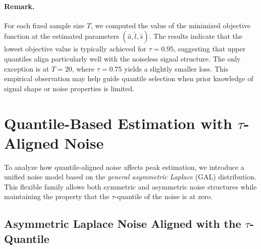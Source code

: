 \documentclass[12pt,a4paper]{article}
\begin{document}
\paragraph{Remark.} For each fixed sample size $T$, we computed the value of the minimized objective function at the estimated parameters $(\hat{a}, \hat{l}, \hat{s})$. The results indicate that the lowest objective value is typically achieved for $\tau = 0.95$, suggesting that upper quantiles align particularly well with the noiseless signal structure. The only exception is at $T = 20$, where $\tau = 0.75$ yields a slightly smaller loss. This empirical observation may help guide quantile selection when prior knowledge of signal shape or noise properties is limited.

\section{\texorpdfstring{Quantile-Based Estimation with $\tau$-Aligned Noise}{Quantile-Based Estimation with tau-Aligned Noise}}
\label{sec:symmetric_laplace_estimation}

To analyze how quantile-aligned noise affects peak estimation, we introduce a unified noise model based on the \textit{general asymmetric Laplace} (GAL) distribution. This flexible family allows both symmetric and asymmetric noise structures while maintaining the property that the $\tau$-quantile of the noise is at zero.

\subsection{Asymmetric Laplace Noise Aligned with the $\tau$-Quantile}
\label{sec:general_AL_intro}
\end{document}

